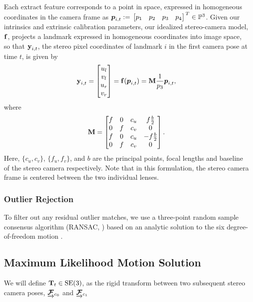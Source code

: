 Each extract feature corresponds to a
point in space, expressed in homogeneous coordinates in the camera frame as
$\HomogeneousPoint{i}{t} := \Transpose{\bbm p_1 & p_2 & p_3 & p_4 \ebm} \in
\HomogeneousNumbers[3]$.  Given our intrinsics and extrinsic calibration parameters, our idealized stereo-camera model, $\boldsymbol{\mathbf{f}}$,
projects a landmark expressed in homogeneous coordinates into image space, so
that $\boldsymbol{\mathbf{y}}_{i, t}$, the stereo pixel coordinates of landmark $i$ in the first camera pose at time $t$, is given
by 
\begin{equation}
	\boldsymbol{\mathbf{y}}_{i, t} = \begin{bmatrix} u_l \\ v_l \\ u_r \\ v_r \end{bmatrix} 
  = \boldsymbol{\mathbf{f}}(\boldsymbol{p}_{i,t}) 
  = \boldsymbol{\mathbf{M}} \frac{1}{p_3}\boldsymbol{p}_{i,t},
\end{equation}
where
\begin{equation}
 \boldsymbol{\mathbf{M}} = \begin{bmatrix} f & 0 & c_u & f \frac{b}{2} \\ 0 & f & c_v & 0 \\ f 
                        & 0 & c_u & -f\frac{b}{2} \\ 0 & f & c_v & 0 \end{bmatrix}.
\end{equation}
Here, $\{c_u, c_v\}$, $\{f_u, f_v\}$, and $b$ are the principal points, focal
lengths and baseline of the stereo camera respectively. Note that in this
formulation, the stereo camera frame is centered between the two individual
lenses. 


\subsubsection{Outlier Rejection}

To filter out any residual outlier matches, we use a three-point random sample consensus algorithm (RANSAC, \cite{FischlerRANSAC:1981}) based on an analytic solution to the six degree-of-freedom motion \citep{Umeyama1991-ws}.
  
\subsection{Maximum Likelihood Motion Solution}
We will define $\boldsymbol{\mathbf{T}}_t \in\text{SE}(3)$, as the rigid transform between two subsequent stereo camera poses, 
$\underrightarrow{ \boldsymbol{\mathbf{\mathcal{F}}} }_{c_0}$ and  $\underrightarrow{ \boldsymbol{\mathbf{\mathcal{F}}} }_{c_1}$

